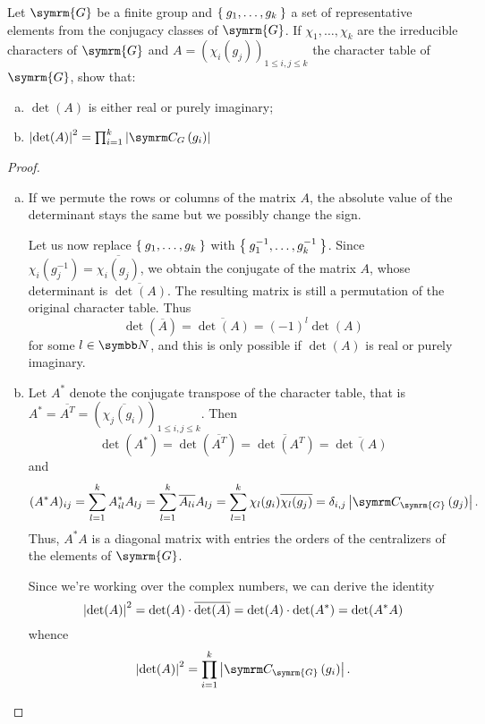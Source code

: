 \begin{exercise}
Let \(\symrm{G}\) be a finite group and \(\Set{ g_1, \dots, g_k }\) a set of representative elements from the conjugacy classes of \(\symrm{G}\). If \(\chi_1, \dots, \chi_k\) are the irreducible characters of \(\symrm{G}\) and \(A = (\chi_i(g_j))_{1 \leq i, j \leq k}\) the character table of \(\symrm{G}\), show that:
\begin{enumerate}[a)]
    \item \(\det(A)\) is either real or purely imaginary;
    \item \(\abs{\det(A)}^2 = \prod_{i=1}^k \abs{\centralizer{G}{g_i}}\)
\end{enumerate}
\end{exercise}
\begin{proof}
~
\begin{enumerate}[a)]
    \item If we permute the rows or columns of the matrix \(A\), the absolute value of the determinant stays the same but we possibly change the sign.
    
    Let us now replace \(\Set{ g_1, \dots, g_k }\) with \(\Set{ g_1^{-1}, \dots, g_k^{-1} }\). Since \(\chi_i (g_j^{-1}) = \overline{\chi_i (g_j)}\), we obtain the conjugate of the matrix \(A\), whose determinant is \(\overline{\det(A)}\). The resulting matrix is still a permutation of the original character table. Thus
    \[
        \det\left(\overline{A}\right) = \overline{\det(A)} = (-1)^l \det(A)
    \]
    for some \(l \in \naturals\), and this is only possible if \(\det(A)\) is real or purely imaginary.
    
    \item Let \(A^*\) denote the conjugate transpose of the character table, that is \(A^* = \overline{A^T} = (\overline{\chi_j (g_i)})_{1 \leq i, j \leq k}\). Then
    \[
        \det\left(A^*\right) = \det\left(\overline{A^T}\right) = \overline{\det\left(A^T\right)} = \overline{\det(A)}
    \]
    and
    \[
        (A^* A)_{i j} = \sum_{l = 1}^{k} A^*_{i l} A_{l j} = \sum_{l = 1}^{k} \overline{A_{l i}} A_{l j} = \sum_{l = 1}^{k} \chi_l (g_i) \overline{\chi_l (g_j)} = \delta_{i, j} \abs{\centralizer{\symrm{G}}{g_j}}.
    \]
    Thus, \(A^* A\) is a diagonal matrix with entries the orders of the centralizers of the elements of \(\symrm{G}\). 
    
    Since we're working over the complex numbers, we can derive the identity
    \[
        \left|\det(A)\right|^2 = \det(A) \cdot \overline{\det(A)} =  \det(A) \cdot \det(A^*) = \det(A^* A)
    \]
    whence
    \[
        \abs{\det(A)}^2 = \prod_{i = 1}^{k} \abs{\centralizer{\symrm{G}}{g_i}}.
    \]
\end{enumerate}
\end{proof}